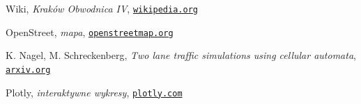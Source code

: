 \documentclass[a4paper,12pt]{article}
\begin{document}
	\pagebreak
	\begin{thebibliography}{15}
		Wiki, \textit{Kraków Obwodnica IV},
		\texttt{\href{https://pl.wikipedia.org/wiki/Obwodnice_Krakowa\#IV_obwodnica}{wikipedia.org}}
		
		OpenStreet, \textit{mapa},
		\texttt{\href{https://www.openstreetmap.org/}{openstreetmap.org}}
		
		K. Nagel, M. Schreckenberg, \textit{Two lane traffic simulations using cellular automata},
		\texttt{\href{https://arxiv.org/pdf/cond-mat/9512119.pdf}{arxiv.org}}
		
		Plotly, \textit{interaktywne wykresy},
		\texttt{\href{https://plotly.com/}{plotly.com}}
	\end{thebibliography}
	
\end{document}
